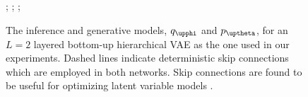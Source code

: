 {\begin{figure}
{        %
        ; %
        ; %
        ; %
    }
        
        
        
    \caption[Inference and generative models for a bottom-up hierarchical VAEs.]{ The inference and generative models, $q_\phib$ and $p_\thetab$, for an $L=2$ layered bottom-up hierarchical VAE as the one used in our experiments.
    Dashed lines indicate deterministic skip connections which are employed in both networks. Skip connections are found to be useful for optimizing latent variable models \parencite{dieng_avoiding_2019, maaloe_biva_2019}.}
    \label{fig_hierarchical:hvae-graphical-model}
\end{figure}


}

